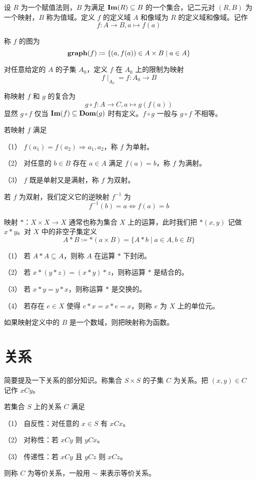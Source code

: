 \begin{definition}
	设 $R$ 为一个赋值法则，$B$ 为满足 $\operatorname{\mathbf{Im}}(R) \subseteq B$ 的一个集合，记二元对 $(R,B)$ 为一个映射，$B$ 称为值域。定义 $f$ 的定义域 $A$ 和像域为 $R$ 的定义域和像域。记作
	$$f:A\to B, a\mapsto f(a)$$
\end{definition}

称 $f$ 的图为
$$\operatorname{\mathbf{graph}}(f) \coloneqq  \{(a,f(a)) \in A\times B \mid a \in A\}$$

对任意给定的 $A$ 的子集 $A_0$，定义 $f$ 在 $A_0$ 上的限制为映射
$$f \mid_{A_0} = f : A_0 \to B$$

称映射 $f$ 和 $g$ 的复合为
$$g\circ f: A \to C, a \mapsto g(f(a))$$
显然 $g \circ f$ 仅当 $\operatorname{\mathbf{Im}}(f) \subseteq \operatorname{\mathbf{Dom}}(g)$ 时有定义。$f\circ g$ 一般与 $g \circ f$ 不相等。

若映射 $f$ 满足

（1） $f(a_1) = f(a_2) \Rightarrow a_1,a_2$，称 $f$ 为单射。

（2） 对任意的 $b\in B$ 存在 $a\in A$ 满足 $f(a)=b$，称 $f$ 为满射。

（3） $f$ 既是单射又是满射，称 $f$ 为双射。

若 $f$ 为双射，我们定义它的逆映射 $f^{-1}$ 为
$$f^{-1}(b) =  a \Leftrightarrow f(a) = b$$

映射 $\ast$：$X\times X \to X$ 通常也称为集合 $X$ 上的运算，此时我们把 $\ast(x,y)$ 记做 $x \ast y$。对 $X$ 中的非空子集定义
$$A \ast B \coloneqq  \ast(a\times B) = \{A \ast b \mid a \in A, b\in B\}$$

\begin{definition}
	（1） 若 $A \ast A \subseteq A$，则称 $A$ 在运算 $\ast$ 下封闭。

	（2） 若 $x \ast (y \ast z) = (x \ast y) \ast z$，则称运算 $\ast$ 是结合的。

	（3） 若 $x \ast y = y \ast x$，则称运算 $\ast$ 是交换的。

	（4） 若存在 $e \in X$ 使得 $e \ast x = x \ast e = x$，则称 $e$ 为 $X$ 上的单位元。
\end{definition}

如果映射定义中的 $B$ 是一个数域，则把映射称为函数。

\section{关系}

简要提及一下关系的部分知识。称集合 $S\times S$ 的子集 $C$ 为关系。把 $(x,y)\in C$ 记作 $xCy$。

\begin{definition}[等价关系]
	若集合 $S$ 上的关系 $C$ 满足

	（1） 自反性：对任意的 $x\in S$ 有 $xCx$。
	
	（2） 对称性：若 $xCy$ 则 $yCx$。

	（3） 传递性：若 $xCy$ 且 $yCz$ 则 $xCz$。

	则称 $C$ 为等价关系，一般用 $\sim$ 来表示等价关系。
\end{definition}

